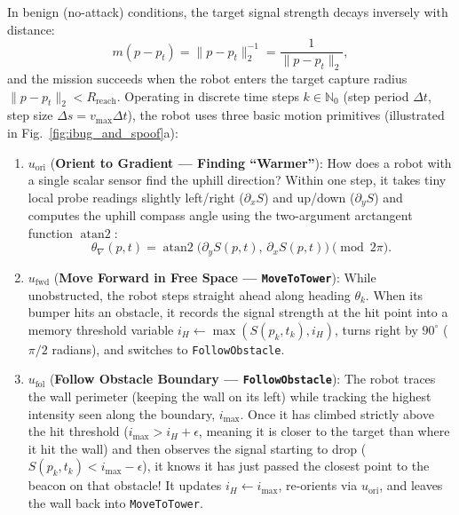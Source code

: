 \documentclass[11pt, a4paper]{article}
\begin{document}
In benign (no-attack) conditions, the target signal strength decays inversely with distance:
\begin{equation*}
    m(p - p_t) = \|p - p_t\|_2^{-1} = \frac{1}{\|p - p_t\|_2},
\end{equation*}
and the mission succeeds when the robot enters the target capture radius $\|p - p_t\|_2 < R_{\text{reach}}$. Operating in discrete time steps $k \in \mathbb{N}_0$ (step period $\Delta t$, step size $\Delta s = v_{\max}\Delta t$), the robot uses three basic motion primitives (illustrated in Fig.~\ref{fig:ibug_and_spoof}a):
\begin{enumerate}
    \item $u_{\text{ori}}$ (\textbf{Orient to Gradient — Finding ``Warmer''}): How does a robot with a single scalar sensor find the uphill direction? Within one step, it takes tiny local probe readings slightly left/right ($\partial_x S$) and up/down ($\partial_y S$) and computes the uphill compass angle using the two-argument arctangent function $\operatorname{atan2}$:
    \begin{equation}
        \theta_{\nabla}(p, t) = \operatorname{atan2}\!\bigl(\partial_y S(p, t),\, \partial_x S(p, t)\bigr) \pmod{2\pi}.
        \label{eq:grad_angle}
    \end{equation}
    \item $u_{\text{fwd}}$ (\textbf{Move Forward in Free Space — \texttt{MoveToTower}}): While unobstructed, the robot steps straight ahead along heading $\theta_k$. When its bumper hits an obstacle, it records the signal strength at the hit point into a memory threshold variable $i_H \leftarrow \max(S(p_k, t_k), i_H)$, turns right by $90^\circ$ ($\pi/2$ radians), and switches to \texttt{FollowObstacle}.
    \item $u_{\text{fol}}$ (\textbf{Follow Obstacle Boundary — \texttt{FollowObstacle}}): The robot traces the wall perimeter (keeping the wall on its left) while tracking the highest intensity seen along the boundary, $i_{\text{max}}$. Once it has climbed strictly above the hit threshold ($i_{\text{max}} > i_H + \epsilon$, meaning it is closer to the target than where it hit the wall) and then observes the signal starting to drop ($S(p_k, t_k) < i_{\text{max}} - \epsilon$), it knows it has just passed the closest point to the beacon on that obstacle! It updates $i_H \leftarrow i_{\text{max}}$, re-orients via $u_{\text{ori}}$, and leaves the wall back into \texttt{MoveToTower}.
\end{enumerate}
\end{document}
